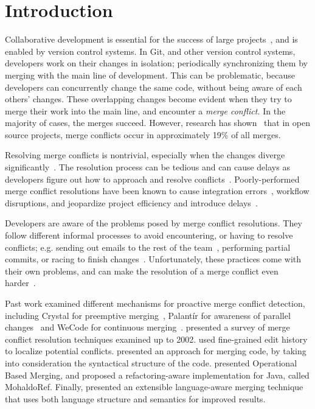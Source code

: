 
\section{Introduction}\label{introduction}

Collaborative development is essential for the success of large projects~\cite{hattori2010syde}, and is enabled by version control systems. 
In Git, and other version control systems, developers work on their changes in isolation; periodically synchronizing them by merging with the main line of development. 
This can be problematic, because developers can concurrently change the same code, without being aware of each others' changes.
These overlapping changes become evident when they try to merge their work into the main line, and encounter a \emph{merge conflict.}
In the majority of cases, the merges succeed.
However, research has shown~\cite{cassandra,Brun2011} that in open source projects, merge conflicts occur in approximately 19\% of all merges.

Resolving merge conflicts is nontrivial, especially when the changes diverge significantly~\cite{Brun2011}.
The resolution process can be tedious and can cause delays as developers figure out how to approach and resolve conflicts~\cite{cassandra}. 
Poorly-performed merge conflict resolutions have been known to cause integration errors~\cite{bird-branches-conflict}, workflow disruptions, and jeopardize project efficiency and introduce delays~\cite{estler2014awareness}. 

Developers are aware of the problems posed by merge conflict resolutions.
They follow different informal processes to avoid encountering, or having to resolve conflicts; e.g. sending out emails to the rest of the team~\cite{deSouza2003breaking}, performing partial commits, or racing to finish changes~\cite{cataldo2008distributed_dev}.
Unfortunately, these practices come with their own problems, and can make the resolution of a merge conflict even harder~\cite{Brun2011}. 

Past work examined different mechanisms for proactive merge conflict detection, including Crystal for preemptive merging~\cite{Brun2011}, Palant\'{i}r for awareness of parallel changes~\cite{palantir} and WeCode for continuous merging~\cite{Guimaraes}.
\citet{mens2002state} presented a survey of merge conflict resolution techniques examined up to 2002.
\citet{nishimura} used fine-grained edit history to localize potential conflicts.
\citet{apel_semistructured_2011,apel_structured_2012-1} presented an approach for merging code, by taking into consideration the syntactical structure of the code.
\citet{lippe_operation-based_1992} presented Operational Based Merging, and \citet{danny2008tse} proposed a refactoring-aware implementation for Java, called MohaldoRef.
Finally, \citet{hunt2002extensible} presented an extensible language-aware merging technique that uses both language structure and semantics for improved results.

